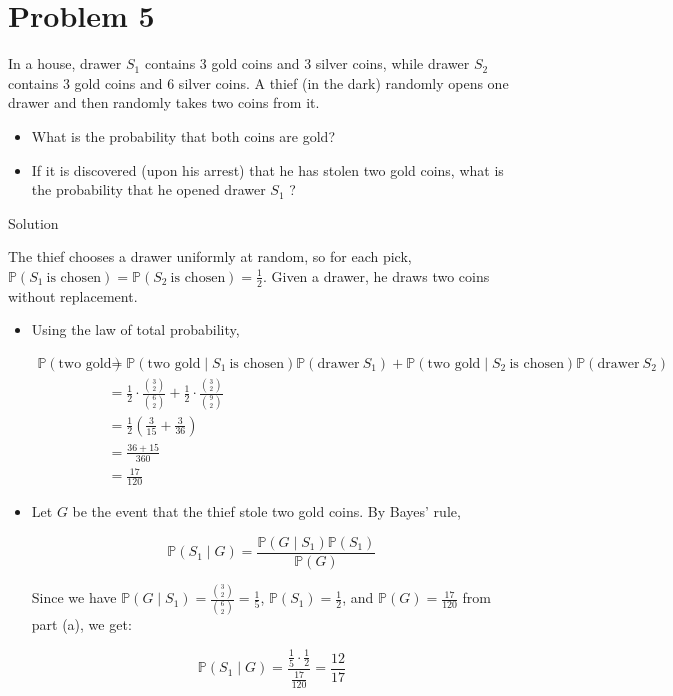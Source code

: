 \section{Problem 5}\label{hw01-problem-5}

In a house, drawer \(\mathit{S}_{1}\) contains 3 gold coins and 3 silver coins, while drawer \(\mathit{S}_{2}\) contains 3 gold coins and 6 silver coins. A thief (in the dark) randomly opens one drawer and then randomly takes two coins from it.

\begin{itemize}
\item
  What is the probability that both coins are gold?
\item
  If it is discovered (upon his arrest) that he has stolen two gold coins, what is the probability that he opened drawer \(\mathit{S}_{1}\) ?
\end{itemize}

\begin{qlsolution}{Solution}

The thief chooses a drawer uniformly at random, so for each pick, \(\mathbb{P}(\mathit{S}_{1}\ \text{is chosen}) = \mathbb{P}(\mathit{S}_{2}\ \text{is chosen}) = \frac{1}{2}\). Given a drawer, he draws two coins without replacement.

\begin{itemize}
\item
  Using the law of total probability,

  \[\begin{matrix}
  {\mathbb{P}(\text{two gold})} & {= \mathbb{P}(\text{two gold} \mid \mathit{S}_{1}\ \text{is chosen})\mathbb{P}(\text{drawer}\ \mathit{S}_{1}) + \mathbb{P}(\text{two gold} \mid \mathit{S}_{2}\ \text{is chosen})\mathbb{P}(\text{drawer}\ \mathit{S}_{2})} \\
   & {= \frac{1}{2} \cdot \frac{\binom{3}{2}}{\binom{6}{2}} + \frac{1}{2} \cdot \frac{\binom{3}{2}}{\binom{9}{2}}} \\
   & {= \frac{1}{2}\left( {\frac{3}{15} + \frac{3}{36}} \right)} \\
   & {= \frac{36 + 15}{360}} \\
   & {= \frac{17}{120}}
  \end{matrix}\]
\item
  Let \(\mathit{G}\) be the event that the thief stole two gold coins. By Bayes' rule,

  \[\mathbb{P}(\mathit{S}_{1} \mid \mathit{G}) = \frac{\mathbb{P}(\mathit{G} \mid \mathit{S}_{1})\mathbb{P}(\mathit{S}_{1})}{\mathbb{P}(\mathit{G})}\]

  Since we have \(\mathbb{P}(\mathit{G} \mid \mathit{S}_{1}) = \frac{\binom{3}{2}}{\binom{6}{2}} = \frac{1}{5}\), \(\mathbb{P}(\mathit{S}_{1}) = \frac{1}{2}\), and \(\mathbb{P}(\mathit{G}) = \frac{17}{120}\) from part (a), we get:

  \[\mathbb{P}(\mathit{S}_{1} \mid \mathit{G}) = \frac{\frac{1}{5} \cdot \frac{1}{2}}{\frac{17}{120}} = \frac{12}{17}\]
\end{itemize}

\end{qlsolution}

